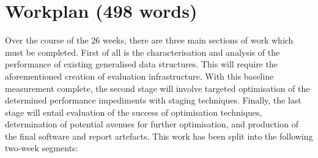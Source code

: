 \documentclass[11pt]{article}
\begin{document}
\section{Workplan (498 words)}


Over the course of the 26 weeks, there are three main sections of work which must be completed. First of all is the characterisation and analysis of the performance of existing generalised data structures. This will require the aforementioned creation of evaluation infrastructure. With this baseline measurement complete, the second stage will involve targeted optimisation of the determined performance impediments with staging techniques. Finally, the last stage will entail evaluation of the success of optimisation techniques, determination of potential avenues for further optimisation, and production of the final software and report artefacts. This work has been split into the following two-week segments:

\renewcommand{\arraystretch}{1.7}
\end{document}
